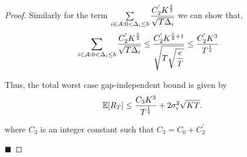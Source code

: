 \begin{proof}
Similarly for the term $\sum\limits_{i\in \mathcal{A} :0 < \Delta_{i}\leq b} \dfrac{C_2^{'} K^{\frac{5}{2}}}{\sqrt{T\Delta_i}}$ we can show that,
\begin{align*}
\sum\limits_{i\in \mathcal{A} :0 < \Delta_{i}\leq b} \dfrac{C_2^{'} K^{\frac{5}{2}}}{\sqrt{T\Delta_i}} &\leq \dfrac{C_2^{'} K^{\frac{5}{2}+1}}{\sqrt{T\sqrt{\dfrac{e}{T}}}} \leq \dfrac{C_2^{'} K^3}{T^{\frac{1}{4}}} 
\end{align*}

Thus, the total worst case gap-independent bound is given by
	\begin{align*}
	\mathbb{E}[R_{T}]\leq  \dfrac{C_3 K^3}{T^{\frac{1}{4}}} + 2\sigma_i^2\sqrt{KT}.
	\end{align*}	
	
where $C_3$ is an integer constant such that $C_3= C_0 + C_2^{'} $

\hfill $\blacksquare$	
\end{proof}